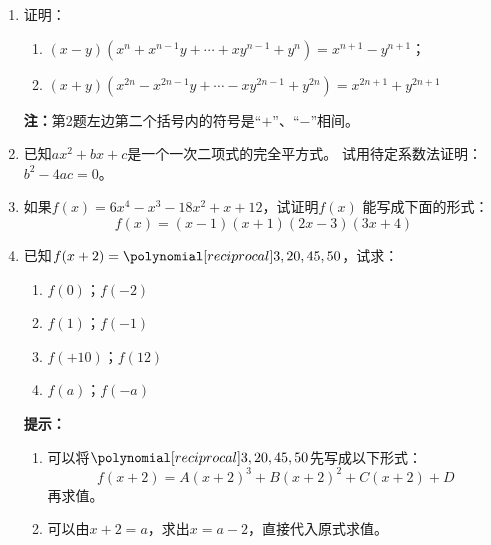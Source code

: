 \begin{enumerate}
\item 证明：
\begin{enumerate}
    \item $(x-y)(x^n+x^{n-1}y+\cdots +xy^{n-1}+y^n)=x^{n+1}-y^{n+1}$；
    \item $(x+y)(x^{2n}-x^{2n-1}y+\cdots -xy^{2n-1}+y^{2n})=x^{2n+1}+y^{2n+1}$
\end{enumerate}
\textbf{注：}第2题左边第二个括号内的符号是“$+$”、“$-$”相间。

\item  已知$ax^2+bx+c$是一个一次二项式的完全平方式。
试用待定系数法证明：$b^2-4ac=0$。
\item  如果$f(x)=6x^4-x^3-18x^2+x+12$，试证明$f(x)$
能写成下面的形式：
\[f(x)=(x-1)(x+1)(2x-3)(3x+4)\]
\item 已知$f(x+2)=\poly{3,20,45,50}$，试求：
    \begin{multicols}{2}
\begin{enumerate}
    \item $f(0)$；$f(-2)$
    \item $f(1)$；$f(-1)$
    \item $f(+10)$；$f(12)$
    \item $f(a)$；$f(-a)$
\end{enumerate}
\end{multicols}
\textbf{提示：}
\begin{enumerate}
    \item 可以将$\poly{3,20,45,50}$先写成以下形式：
    \[f(x+2)=A(x+2)^3+B(x+2)^2+C(x+2)+D\]
    再求值。
    \item 可以由$x+2=a$，求出$x=a-2$，直接代入原式求值。
\end{enumerate}

\end{enumerate}


